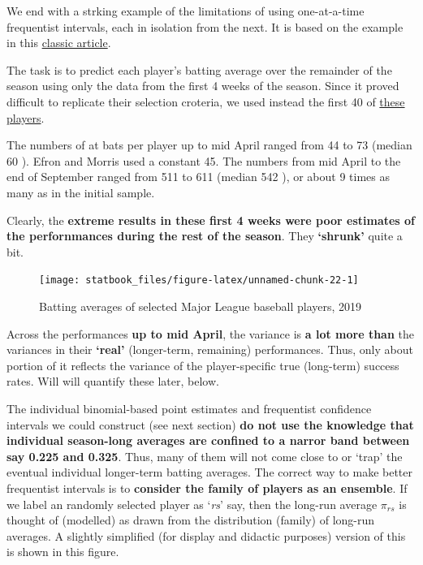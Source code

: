 \documentclass[]{book}
\begin{document}
We end with a strking example of the limitations of using one-at-a-time frequentist intervals, each in isolation from the next. It is based on the example in this \href{http://www.medicine.mcgill.ca/epidemiology/hanley/bios602/MultilevelData/EfronMorrisJASA1975.pdf}{classic article}.

The task is to predict each player's batting average over the remainder of the season using only the data from the first 4 weeks of the season. Since it proved difficult to replicate their selection croteria, we used instead the first 40 of \href{http://mlb.mlb.com/stats/sortable.jsp\#elem=\%5Bobject+Object\%5D\&tab_level=child\&click_text=Sortable+Player+hitting\&game_type='R'\&season=2019\&season_type=ANY\&league_code='MLB'\&sectionType=sp\&statType=hitting\&page=1\&ts=1586307216206\&playerType=ALL\&timeframe=\&last_x_days=\&split=\&sortColumn=ab\&sortOrder='desc'\&extended=0}{these players}.

The numbers of at bats per player up to mid April ranged from 44 to 73 (median 60 ). Efron and Morris used a constant 45. The numbers from mid April to the end of September ranged from 511 to 611 (median 542 ), or about 9 times as many as in the initial sample.

Clearly, the \textbf{extreme results in these first 4 weeks were poor estimates of the perfornmances during the rest of the season}. They \textbf{`shrunk'} quite a bit.

\begin{figure}

{\centering \texttt{[image: statbook\_files/figure-latex/unnamed-chunk-22-1]} 

}

\caption{Batting averages of selected Major League baseball players, 2019}\label{fig:unnamed-chunk-22}
\end{figure}

Across the performances \textbf{up to mid April}, the variance is \textbf{a lot more than} the variances in their \textbf{`real'} (longer-term, remaining) performances. Thus, only about portion of it reflects the variance of the player-specific true (long-term) success rates. Will will quantify these later, below.

The individual binomial-based point estimates and frequentist confidence intervals we could construct (see next section) \textbf{do not use the knowledge that individual season-long averages are confined to a narror band between say 0.225 and 0.325}. Thus, many of them will not come close to or `trap' the eventual individual longer-term batting averages. The correct way to make better frequentist intervals is to \textbf{consider the family of players as an ensemble}. If we label an randomly selected player as `\emph{rs}' say, then the long-run average \(\pi_{rs}\) is thought of (modelled) as drawn from the distribution (family) of long-run averages. A slightly simplified (for display and didactic purposes) version of this is shown in this figure.
\end{document}
